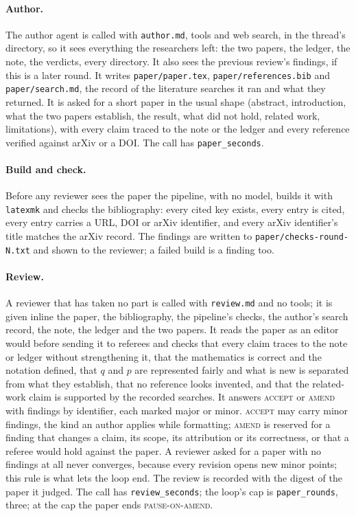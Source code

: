 \documentclass[11pt,a4paper]{article}
\newcommand{\st}[1]{\textsc{#1}}
\newcommand{\file}[1]{\texttt{#1}}
\begin{document}
\paragraph{Author.} The author agent is called with \file{author.md}, tools and web search, in
the thread's directory, so it sees everything the researchers left: the two papers, the ledger,
the note, the verdicts, every directory. It also sees the previous review's findings, if this
is a later round. It writes \file{paper/paper.tex}, \file{paper/references.bib} and
\file{paper/search.md}, the record of the literature searches it ran and what they returned. It
is asked for a short paper in the usual shape (abstract, introduction, what the two papers
establish, the result, what did not hold, related work, limitations), with every claim traced
to the note or the ledger and every reference verified against arXiv or a DOI. The call has
\file{paper\_seconds}.

\paragraph{Build and check.} Before any reviewer sees the paper the pipeline, with no model,
builds it with \file{latexmk} and checks the bibliography: every cited key exists, every entry
is cited, every entry carries a URL, DOI or arXiv identifier, and every arXiv identifier's title
matches the arXiv record. The findings are written to \file{paper/checks-round-N.txt} and shown
to the reviewer; a failed build is a finding too.

\paragraph{Review.} A reviewer that has taken no part is called with \file{review.md} and no
tools; it is given inline the paper, the bibliography, the pipeline's checks, the author's
search record, the note, the ledger and the two papers. It reads the paper as an editor would
before sending it to referees and checks that every claim traces to the note or ledger without
strengthening it, that the mathematics is correct and the notation defined, that $q$ and $p$
are represented fairly and what is new is separated from what they establish, that no reference
looks invented, and that the related-work claim is supported by the recorded searches. It
answers \st{accept} or \st{amend} with findings by identifier, each marked major or minor.
\st{accept} may carry minor findings, the kind an author applies while formatting; \st{amend}
is reserved for a finding that changes a claim, its scope, its attribution or its correctness,
or that a referee would hold against the paper. A reviewer asked for a paper with no findings at
all never converges, because every revision opens new minor points; this rule is what lets the
loop end. The review is recorded with the digest of the paper it judged. The call has
\file{review\_seconds}; the loop's cap is \file{paper\_rounds}, three; at the cap the paper
ends \st{pause-on-amend}.
\end{document}
